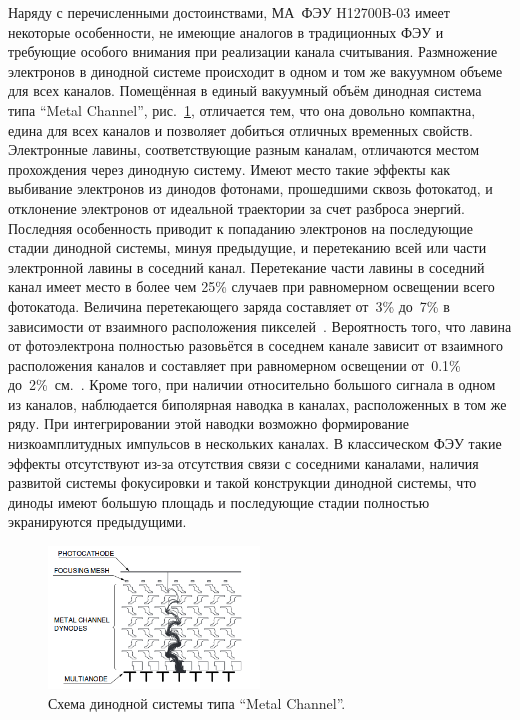 Наряду с перечисленными достоинствами, МА~ФЭУ H12700B-03 имеет некоторые особенности, не имеющие аналогов в традиционных ФЭУ и требующие особого внимания при реализации канала считывания. Размножение электронов в динодной системе происходит в одном и том же вакуумном объеме для всех каналов. Помещённая в единый вакуумный объём динодная система типа ``Metal Channel'', рис.~\ref{fig:MetalChannel}, отличается тем, что она довольно компактна, едина для всех каналов и позволяет добиться отличных временных свойств. Электронные лавины, соответствующие разным каналам, отличаются местом прохождения через динодную систему. Имеют место такие эффекты как выбивание электронов из динодов фотонами, прошедшими сквозь фотокатод, и отклонение электронов от идеальной траектории за счет разброса энергий. Последняя особенность приводит к попаданию электронов на последующие стадии динодной системы, минуя предыдущие, и перетеканию всей или части электронной лавины в соседний канал. Перетекание части лавины в соседний канал имеет место в более чем 25\% случаев при равномерном освещении всего фотокатода. Величина перетекающего заряда составляет от~3\% до~7\% в зависимости от взаимного расположения пикселей~\cite{}. Вероятность того, что лавина от фотоэлектрона полностью разовьётся в соседнем канале зависит от взаимного расположения каналов и составляет при равномерном освещении от~0.1\% до~2\%~см.~\cite{KOPFERDISS}. Кроме того, при наличии относительно большого сигнала в одном из каналов, наблюдается биполярная наводка в каналах, расположенных в том же ряду. При интегрировании этой наводки возможно формирование низкоамплитудных импульсов в нескольких каналах. В классическом ФЭУ такие эффекты отсутствуют из-за отсутствия связи с соседними каналами, наличия развитой системы фокусировки и такой конструкции динодной системы, что диноды имеют большую площадь и последующие стадии полностью экранируются предыдущими.

\begin{figure}
\includegraphics[width=0.5\textwidth]{pictures/2_Metal_channel.png}
\caption{Схема динодной системы типа ``Metal Channel''.}
\label{fig:MetalChannel}
\end{figure}

